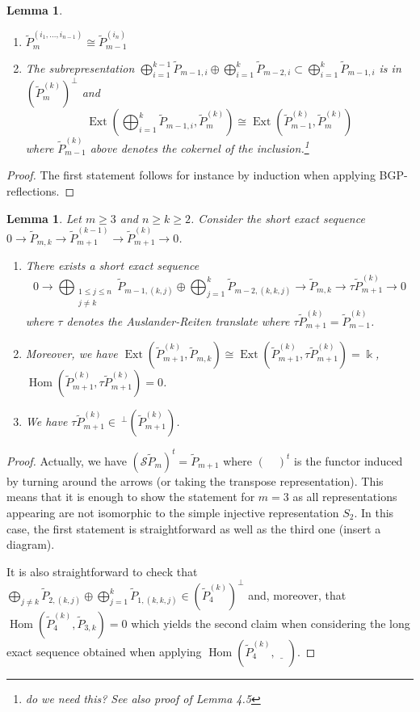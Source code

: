 \documentclass{amsart}
\newtheorem{lemma}[theorem]{Lemma}
\newcommand{\kk}{\Bbbk}
\newcommand{\Ext}{\operatorname{Ext}}
\newcommand{\Hom}{\operatorname{Hom}}
\newcommand{\ses}[3]{0\rightarrow #1\rightarrow #2\rightarrow#3\rightarrow 0}
\begin{document}
\begin{lemma}
  \begin{enumerate}
    \item $\tilde P_m^{(i_1,\ldots,i_{n-1})}\cong\tilde P_{m-1}^{(i_n)}$
    \item The subrepresentation $\bigoplus_{i=1}^{k-1}\tilde P_{m-1,i}\oplus\bigoplus_{i=1}^k\tilde P_{m-2,i}\subset\bigoplus_{i=1}^k\tilde P_{m-1,i}$ is in $(\tilde P_m^{(k)})^\perp$ and
      \[\Ext(\bigoplus_{i=1}^k\tilde P_{m-1,i},\tilde P_m^{(k)})\cong\Ext(\tilde P_{m-1}^{(k)},\tilde P_m^{(k)})\]
      where $\tilde P_{m-1}^{(k)}$ above denotes the cokernel of the inclusion.\footnote{do we need this? See also proof of Lemma 4.5}
  \end{enumerate}
\end{lemma}
\begin{proof}
The first statement follows for instance by induction when applying BGP-reflections.
\end{proof}
\begin{lemma}\label{AR}
Let $m\geq 3$ and $n\geq k\geq 2$. Consider the short exact sequence $\ses{\tilde P_{m,k}}{\tilde P_{m+1}^{(k-1)}}{\tilde P_{m+1}^{(k)}}$. 
\begin{enumerate}
\item There exists a short exact sequence 
\[\ses{\bigoplus_{\substack{1\leq j\leq n\\j\neq k}}\tilde P_{m-1,(k,j)}\oplus \bigoplus_{j=1}^k\tilde P_{m-2,(k,k,j)}}{\tilde P_{m,k}}{\tau\tilde P_{m+1}^{(k)}}\]
where $\tau$ denotes the Auslander-Reiten translate where
$\tau\tilde P_{m+1}^{(k)}=\tilde P_{m-1}^{(k)}$. 
\item Moreover, we have $\Ext(\tilde P_{m+1}^{(k)},\tilde P_{m,k})\cong \Ext(\tilde P_{m+1}^{(k)},\tau\tilde P_{m+1}^{(k)})=\kk$, $\Hom(\tilde P_{m+1}^{(k)},\tau\tilde P_{m+1}^{(k)})=0$. 
\item We have $\tau\tilde P_{m+1}^{(k)}\in ~^\perp(\tilde P_{m+1}^{(k)})$.
\end{enumerate}%
\end{lemma}
\begin{proof}
Actually, we have $(\mathcal  S \tilde P_m)^t=\tilde P_{m+1}$ where $(\quad)^t$ is the functor induced by turning around the arrows (or taking the transpose representation). This means that it is enough to show the statement for $m=3$ as all representations appearing are not isomorphic to the simple injective representation $S_2$. In this case, the first statement is straightforward as well as the third one (insert a diagram).

It is also straightforward to check that $\bigoplus_{j\neq k}\tilde P_{2,(k,j)}\oplus \bigoplus_{j=1}^k\tilde P_{1,(k,k,j)}\in (\tilde P_{4}^{(k)})^\perp$ and, moreover, that $\Hom(\tilde P_{4}^{(k)},\tilde P_{3,k})=0$ which yields the second claim when considering the long exact sequence obtained when applying $\Hom(\tilde P_{4}^{(k)},\underline{\quad})$.


\end{proof}
\end{document}
